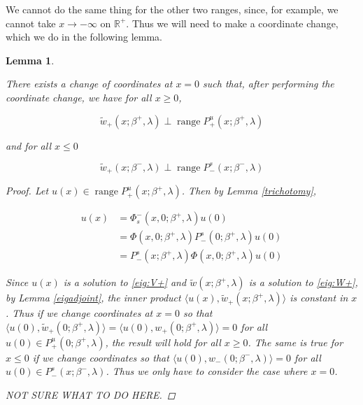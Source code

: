 \documentclass[12pt]{article}
\def\R{{\mathbb R}}
\DeclareMathOperator{\ran}{range}
\newtheorem{lemma}{Lemma}
\begin{document}
We cannot do the same thing for the other two ranges, since, for example, we cannot take $x \rightarrow -\infty$ on $\R^+$. Thus we will need to make a coordinate change, which we do in the following lemma.


\begin{lemma}\label{perpinner}

There exists a change of coordinates at $x = 0$ such that, after performing the coordinate change, we have for all $x \geq 0$,

\begin{equation}
\tilde{w}_+(x; \beta^+, \lambda) \perp \ran P^u_+(x; \beta^+, \lambda)
\end{equation}

and for all $x \leq 0$

\begin{equation}
\tilde{w}_+(x; \beta^-, \lambda) \perp \ran P^s_-(x; \beta^-, \lambda)
\end{equation}

\begin{proof}

Let $u(x) \in \ran P^u_+(x; \beta^+, \lambda)$. Then by Lemma \ref{trichotomy},

\begin{align*}
u(x) &= \Phi_s^-(x, 0; \beta^+, \lambda)u(0) \\
&= \Phi(x, 0; \beta^+, \lambda) P^s_-(0; \beta^+, \lambda)u(0)\\
&= P^s_-(x; \beta^+, \lambda) \Phi(x, 0; \beta^+, \lambda) u(0)
\end{align*}

Since $u(x)$ is a solution to \eqref{eig:V+} and $\tilde{w}(x; \beta^+, \lambda)$ is a solution to \eqref{eig:W+}, by Lemma \ref{eigadjoint}, the inner product $\langle u(x), \tilde{w}_+(x; \beta^+, \lambda) \rangle$ is constant in $x$. Thus if we change coordinates at $x = 0$ so that $\langle u(0), \tilde{w}_+(0; \beta^+, \lambda) \rangle = \langle u(0), w_+(0; \beta^+, \lambda) \rangle = 0$ for all $u(0) \in P^u_+(0; \beta^+, \lambda)$, the result will hold for all $x \geq 0$. The same is true for $x \leq 0$ if we change coordinates so that $\langle u(0), w_-(0; \beta^-, \lambda) \rangle = 0$ for all $u(0) \in P^s_-(x; \beta^-, \lambda)$. Thus we only have to consider the case where $x = 0$.

NOT SURE WHAT TO DO HERE.

\end{proof}
\end{lemma}
\end{document}
